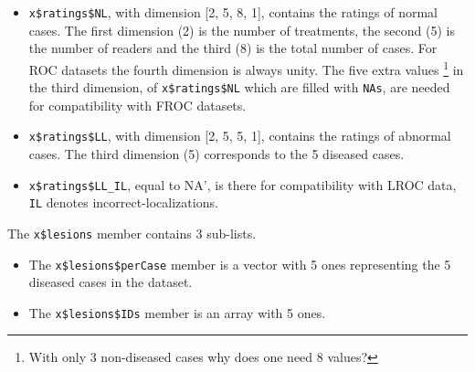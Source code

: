 \documentclass[
]{book}
\newenvironment{Shaded}{\begin{snugshade}}{\end{snugshade}}
\newcommand{\CommentTok}[1]{\textcolor[rgb]{0.56,0.35,0.01}{\textit{#1}}}
\newcommand{\FunctionTok}[1]{\textcolor[rgb]{0.00,0.00,0.00}{#1}}
\newcommand{\NormalTok}[1]{#1}
\newcommand{\SpecialCharTok}[1]{\textcolor[rgb]{0.00,0.00,0.00}{#1}}
\begin{document}
\begin{itemize}
\item
  \texttt{x\$ratings\$NL}, with dimension {[}2, 5, 8, 1{]}, contains the ratings of normal cases. The first dimension (2) is the number of treatments, the second (5) is the number of readers and the third (8) is the total number of cases. For ROC datasets the fourth dimension is always unity. The five extra values \footnote{With only 3 non-diseased cases why does one need 8 values?} in the third dimension, of \texttt{x\$ratings\$NL} which are filled with \texttt{NAs}, are needed for compatibility with FROC datasets.
\item
  \texttt{x\$ratings\$LL}, with dimension {[}2, 5, 5, 1{]}, contains the ratings of abnormal cases. The third dimension (5) corresponds to the 5 diseased cases.
\item
  \texttt{x\$ratings\$LL\_IL}, equal to NA', is there for compatibility with LROC data, \texttt{IL} denotes incorrect-localizations.
\end{itemize}

The \texttt{x\$lesions} member contains 3 sub-lists.

\begin{Shaded}
\end{Shaded}

\begin{itemize}
\item
  The \texttt{x\$lesions\$perCase} member is a vector with 5 ones representing the 5 diseased cases in the dataset.
\item
  The \texttt{x\$lesions\$IDs} member is an array with 5 ones.
\end{itemize}

\begin{Shaded}
\end{Shaded}
\end{document}
